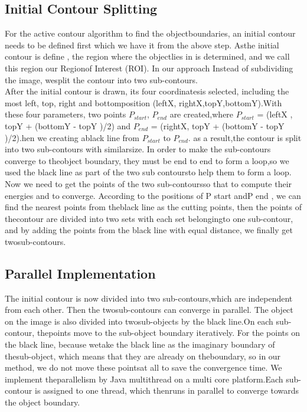\subsection{Initial Contour Splitting}\label{subsec:initial-contour-splitting}
For the active contour algorithm to find the objectboundaries, an initial contour
needs to be defined first which we have it from the above step. Asthe initial contour
is define , the region where the objectlies in is determined, and we call this region
our Regionof Interest (ROI). In our approach Instead of subdividing the image, wesplit
the contour into two sub-contours.\\
After the initial contour is drawn, its four coordinatesis selected, including the
most left, top, right and bottomposition (leftX, rightX,topY,bottomY).With these four
parameters, two points $P_{start}$, $P_{end}$ are created,where $P_{start}$ = (leftX , topY + (bottomY -
topY )/2) and $P_{end}$ = (rightX, topY + (bottomY - topY )/2).hen we creating ablack
line from $P_{start}$ to $P_{end}$. as a result,the contour is split into two sub-contours with
similarsize. In order to make the sub-contours converge to theobject boundary, they
must be end to end to form a loop,so we used the black line as part of the two sub
contoursto help them to form a loop.\\
Now we need to get the points of the two sub-contoursso that to compute their
energies and to converge. According to the positions of P start andP end , we can find the
nearest points from theblack line as the cutting points, then the points of thecontour
are divided into two sets with each set belongingto one sub-contour, and by adding
the points from the black line with equal distance, we finally get twosub-contours.
\subsection{Parallel Implementation}\label{subsec:parallel-implementation}
The initial contour is now divided into two sub-contours,which are independent from
each other. Then the twosub-contours can converge in parallel. The object on the
image is also divided into twosub-objects by the black line.On each sub-contour,
thepoints move to the sub-object boundary iteratively. For the points on the black
line, because wetake the black line as the imaginary boundary of thesub-object,
which means that they are already on theboundary, so in our method, we do not
move these pointsat all to save the convergence time.
We implement theparallelism by Java multithread on a multi core platform.Each sub-
contour is assigned to one thread, which thenruns in parallel to converge towards the
object boundary.
